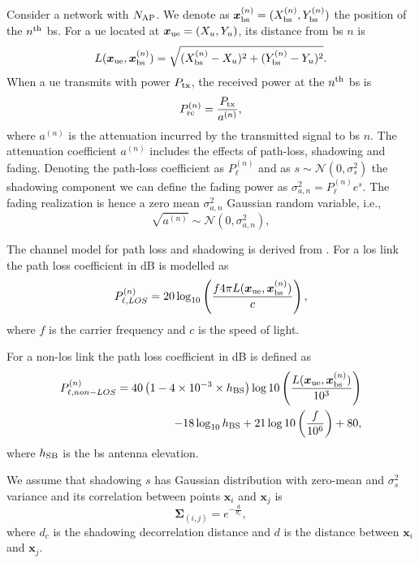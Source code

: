 \documentclass[twocolumns]{IEEEtran}
\begin{document}
Consider a network with $N_{\rm AP}$. We denote as $\bm{x}_{\rm bs}^{(n)} =(X_{\rm bs}^{(n)},Y_{\rm bs}^{(n)})$ the position of the $n^{\rm th}$ \ac{bs}. For a \ac{ue} located at $\bm{x}_{\rm ue}=(X_u,Y_u)$, its distance from \ac{bs} $n$ is
\begin{equation}
    L(\bm{x}_{\rm ue},\bm{x}_{\rm bs}^{(n)}) = \sqrt{(X_{\rm bs}^{(n)}-X_u)^2+(Y_{\rm bs}^{(n)}-Y_u)^2}.
\end{equation}
When a \ac{ue} transmits with power $P_{\rm tx}$, the received power at the $n^{\rm th}$ \ac{bs} is
\begin{equation}\label{eq: rec pow}
    P_{\rm rc}^{(n)}= \frac{P_{\rm tx}}{a^{(n)}},
\end{equation}
where $a^{(n)}$ is the attenuation incurred by the transmitted signal to \ac{bs} $n$. The attenuation coefficient $a^{(n)}$ includes the effects of path-loss, shadowing and fading. Denoting the path-loss coefficient as $P_{\ell}^{(n)}$ and as $s \sim \mathcal{N}(0,\sigma_s^2)$ the shadowing component we can define the fading power as $\sigma_{a,n}^2={P_{\ell}^{(n)}}e^{s}$. The fading realization is hence a zero mean $\sigma_{a,n}^2$ Gaussian random variable, i.e.,
\begin{equation}
    \sqrt{a^{(n)}} \sim \mathcal{N}\left(0,\sigma_{a,n}^2\right),
\end{equation}

The channel model for path loss and shadowing is derived from \cite{3gpp}. For a \ac{los} link the path loss coefficient in dB is modelled as
\begin{equation}\label{eq:los}
    P_{\ell,LOS}^{(n)} = 20\log_{10}\left(\frac{f 4\pi L(\bm{x}_{\rm ue},\bm{x}_{\rm bs}^{(n)})}{c}\right),
\end{equation}
where $f$ is the carrier frequency and $c$ is the speed of light.

For a  non-\ac{los} link the path loss coefficient in dB is defined as
\begin{equation}
\begin{split}
    P_{\ell, non-LOS}^{(n)} = 40\left(1-4\times 10^{-3}\times h_{\rm BS}\right)\log10\left (\frac{L(\bm{x}_{\rm ue},\bm{x}_{\rm bs}^{(n)})}{10^3}\right ) \\
    -18\log_{10}h_{\rm BS}
    + 21\log10\left(\frac{f}{10^6}\right) + 80,
    \end{split}
\end{equation}
where $h_{\rm SB}$ is the \ac{bs} antenna elevation.

We assume that shadowing $s$ has  Gaussian distribution with zero-mean and $\sigma_s^2$ variance and its correlation between points $\bm{x}_i$ and $\bm{x}_j$ is
\begin{equation}\label{eq: coor mat}
    \bm{\Sigma}_{(i,j)} = e^{-\frac{d}{d_c}},
\end{equation}
where $d_c$ is the shadowing decorrelation distance and $d$ is the distance between $\bm{x}_i$ and $\bm{x}_j$. 
\end{document}
